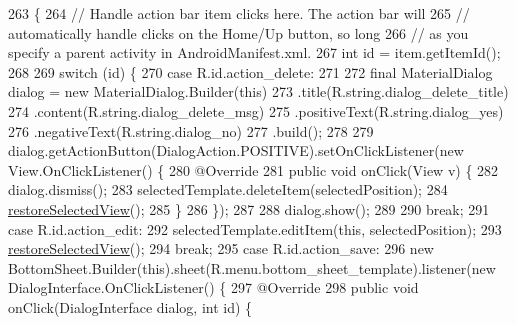 \begin{DoxyCode}
263                                                         \{
264         \textcolor{comment}{// Handle action bar item clicks here. The action bar will}
265         \textcolor{comment}{// automatically handle clicks on the Home/Up button, so long}
266         \textcolor{comment}{// as you specify a parent activity in AndroidManifest.xml.}
267         \textcolor{keywordtype}{int} \textcolor{keywordtype}{id} = item.getItemId();
268 
269         \textcolor{keywordflow}{switch} (\textcolor{keywordtype}{id}) \{
270             \textcolor{keywordflow}{case} R.id.action\_delete:
271 
272                 \textcolor{keyword}{final} MaterialDialog dialog = \textcolor{keyword}{new} MaterialDialog.Builder(\textcolor{keyword}{this})
273                         .title(R.string.dialog\_delete\_title)
274                         .content(R.string.dialog\_delete\_msg)
275                         .positiveText(R.string.dialog\_yes)
276                         .negativeText(R.string.dialog\_no)
277                         .build();
278 
279                 dialog.getActionButton(DialogAction.POSITIVE).setOnClickListener(\textcolor{keyword}{new} View.OnClickListener()
       \{
280                     @Override
281                     \textcolor{keyword}{public} \textcolor{keywordtype}{void} onClick(View v) \{
282                         dialog.dismiss();
283                         selectedTemplate.deleteItem(selectedPosition);
284                         \hyperlink{classorg_1_1buildmlearn_1_1toolkit_1_1activity_1_1TemplateEditor_ae1fb961405f616070237c13e64f5b5bc}{restoreSelectedView}();
285                     \}
286                 \});
287 
288                 dialog.show();
289 
290                 \textcolor{keywordflow}{break};
291             \textcolor{keywordflow}{case} R.id.action\_edit:
292                 selectedTemplate.editItem(\textcolor{keyword}{this}, selectedPosition);
293                 \hyperlink{classorg_1_1buildmlearn_1_1toolkit_1_1activity_1_1TemplateEditor_ae1fb961405f616070237c13e64f5b5bc}{restoreSelectedView}();
294                 \textcolor{keywordflow}{break};
295             \textcolor{keywordflow}{case} R.id.action\_save:
296                 \textcolor{keyword}{new} BottomSheet.Builder(\textcolor{keyword}{this}).sheet(R.menu.bottom\_sheet\_template).listener(\textcolor{keyword}{new} 
      DialogInterface.OnClickListener() \{
297                     @Override
298                     \textcolor{keyword}{public} \textcolor{keywordtype}{void} onClick(DialogInterface dialog, \textcolor{keywordtype}{int} \textcolor{keywordtype}{id}) \{

\end{DoxyCode}
